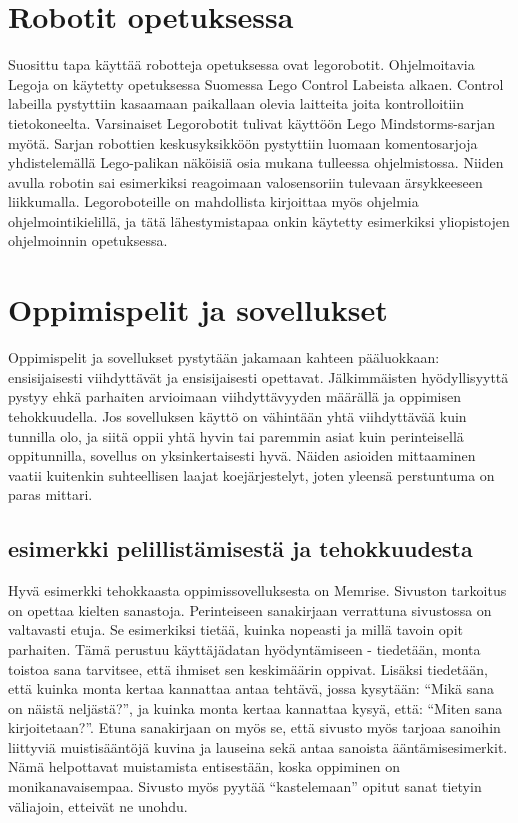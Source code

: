 \documentclass[utf8,bachelor]{gradu3}
\begin{document}





\section{Robotit opetuksessa}
Suosittu tapa käyttää robotteja opetuksessa ovat legorobotit. Ohjelmoitavia Legoja on käytetty opetuksessa Suomessa  Lego Control Labeista alkaen. \parencite[][]{skrolliRobot} Control labeilla pystyttiin kasaamaan paikallaan olevia laitteita joita kontrolloitiin tietokoneelta. Varsinaiset Legorobotit tulivat käyttöön Lego Mindstorms-sarjan myötä. Sarjan robottien keskusyksikköön pystyttiin luomaan komentosarjoja yhdistelemällä Lego-palikan näköisiä osia mukana tulleessa ohjelmistossa. Niiden avulla robotin sai esimerkiksi reagoimaan valosensoriin tulevaan ärsykkeeseen liikkumalla. Legoroboteille on mahdollista kirjoittaa myös ohjelmia ohjelmointikielillä, ja tätä lähestymistapaa onkin käytetty esimerkiksi yliopistojen ohjelmoinnin opetuksessa. \parencite[][]{korppirobo} \parencite[][]{hesarobo}

\section{Oppimispelit ja sovellukset}
Oppimispelit ja sovellukset pystytään jakamaan kahteen pääluokkaan: ensisijaisesti viihdyttävät ja ensisijaisesti opettavat. Jälkimmäisten hyödyllisyyttä pystyy ehkä parhaiten arvioimaan viihdyttävyyden määrällä ja oppimisen tehokkuudella. Jos sovelluksen käyttö on vähintään yhtä viihdyttävää kuin tunnilla olo, ja siitä oppii yhtä hyvin tai paremmin asiat kuin perinteisellä oppitunnilla, sovellus on yksinkertaisesti hyvä. Näiden asioiden mittaaminen vaatii kuitenkin suhteellisen laajat koejärjestelyt, joten yleensä perstuntuma on paras mittari.

\subsection{esimerkki pelillistämisestä ja tehokkuudesta}
Hyvä esimerkki tehokkaasta oppimissovelluksesta on Memrise.\parencite[][]{memrise} Sivuston tarkoitus on opettaa kielten sanastoja. Perinteiseen sanakirjaan verrattuna sivustossa on valtavasti etuja. Se esimerkiksi tietää, kuinka nopeasti ja millä tavoin opit parhaiten. Tämä perustuu käyttäjädatan hyödyntämiseen - tiedetään, monta toistoa sana tarvitsee, että ihmiset sen keskimäärin oppivat. Lisäksi tiedetään, että kuinka monta kertaa kannattaa antaa tehtävä, jossa kysytään: “Mikä sana on näistä neljästä?”, ja kuinka monta kertaa kannattaa kysyä, että: “Miten sana kirjoitetaan?”. Etuna sanakirjaan on myös se, että sivusto myös tarjoaa sanoihin liittyviä muistisääntöjä kuvina ja lauseina sekä antaa sanoista ääntämisesimerkit. Nämä helpottavat muistamista entisestään, koska oppiminen on monikanavaisempaa. Sivusto myös pyytää “kastelemaan” opitut sanat tietyin väliajoin, etteivät ne unohdu.
\end{document}
